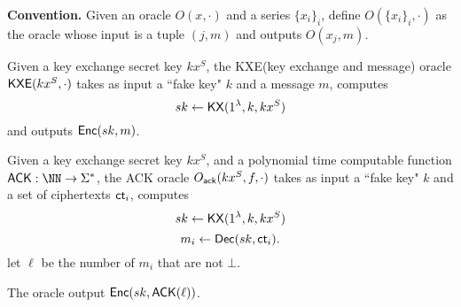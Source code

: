 
\textbf{Convention.} Given an oracle $O(x, \cdot)$ and a series $\{x_i\}_i$, define $O(\{x_i\}_i, \cdot)$ as the oracle whose input is a tuple $(j, m)$ and outputs $O(x_j, m)$.

\begin{definition}
Given a key exchange secret key $kx^S$, the KXE(key exchange and message) oracle $\mathsf{KXE}(kx^S, \cdot)$ takes as input a ``fake key" $k$ and a message $m$, computes
$$sk \leftarrow \mathsf{KX}(1^{\lambda}, k, kx^S)$$
and outputs $\mathsf{Enc}(sk, m)$.
\end{definition}
\begin{definition}
Given a key exchange secret key $kx^S$, and a polynomial time computable function $\ACK: \NN \to \Sigma^*$, the ACK oracle $O_{\mathsf{ack}}(kx^S, f, \cdot)$ takes as input a ``fake key" $k$ and a set of ciphertexts $\mathsf{ct}_i$, computes
$$sk \leftarrow \mathsf{KX}(1^{\lambda}, k, kx^S)$$
$$m_i \leftarrow \mathsf{Dec}(sk, \mathsf{ct}_i).$$
let $\ell$ be the number of $m_i$ that are not $\bot$. 

The oracle output $\mathsf{Enc}(sk, \mathsf{ACK}(\ell))$.
\end{definition}
